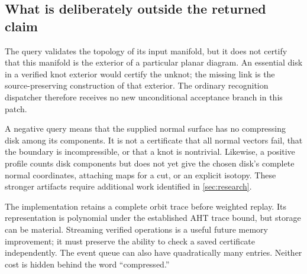 \subsection{What is deliberately outside the returned claim}

The query validates the topology of its input manifold, but it does not
certify that this manifold is the exterior of a particular planar diagram.
An essential disk in a verified knot exterior would certify the unknot;
the missing link is the source-preserving construction of that exterior.
The ordinary recognition dispatcher therefore receives no new unconditional
acceptance branch in this patch.

A negative query means that the supplied normal surface has no compressing
disk among its components.  It is not a certificate that all normal vectors
fail, that the boundary is incompressible, or that a knot is nontrivial.
Likewise, a positive profile counts disk components but does not yet give
the chosen disk's complete normal coordinates, attaching maps for a cut,
or an explicit isotopy.  These stronger artifacts require additional work
identified in \cref{sec:research}.

The implementation retains a complete orbit trace before weighted replay.
Its representation is polynomial under the established AHT trace bound,
but storage can be material.  Streaming verified operations is a useful
future memory improvement; it must preserve the ability to check a saved
certificate independently.  The event queue can also have quadratically
many entries.  Neither cost is hidden behind the word ``compressed.''
